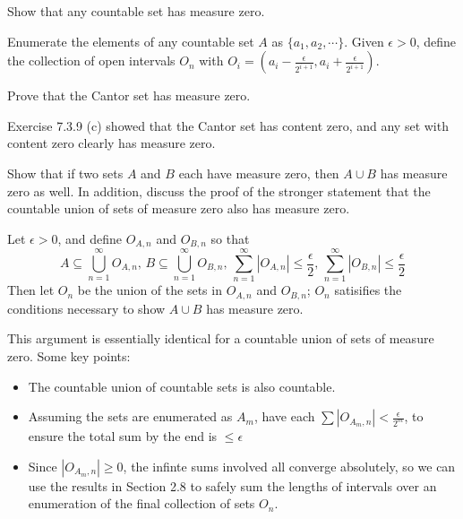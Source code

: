 \begin{exercise}
Show that any countable set has measure zero.
\end{exercise}
\begin{solution}
Enumerate the elements of any countable set \(A\) as \(\{a_1, a_2, \cdots\}\). Given \(\epsilon > 0\), define the collection of open intervals \(O_n\) with \(O_i = (a_i - \frac{\epsilon}{2^{i + 1}}, a_i + \frac{\epsilon}{2^{i+1}})\).
\end{solution}

\begin{exercise}
Prove that the Cantor set has measure zero.
\end{exercise}

\begin{solution}
Exercise 7.3.9 (c) showed that the Cantor set has content zero, and any set with content zero clearly has measure zero.
\end{solution}

\begin{exercise}
Show that if two sets \(A\) and \(B\) each have measure zero, then \(A \cup B\) has measure zero as well. In addition, discuss the proof of the stronger statement that the countable union of sets of measure zero also has measure zero.
\end{exercise}

\begin{solution}
Let \(\epsilon > 0\), and define \(O_{A,n}\) and \(O_{B,n}\) so that
\[A \subseteq \bigcup^\infty_{n=1} O_{A,n} \text{, }
B \subseteq \bigcup^\infty_{n=1} O_{B,n} \text{, }
\sum^\infty_{n=1}|O_{A,n}| \leq \frac{\epsilon}{2} \text{, }
\sum^\infty_{n=1}|O_{B,n}| \leq \frac{\epsilon}{2}
\]
Then let \(O_n\) be the union of the sets in \(O_{A,n}\) and \(O_{B,n}\); \(O_n\) satisifies the conditions necessary to show \(A \cup B\) has measure zero.

This argument is essentially identical for a countable union of sets of measure zero. Some key points:
\begin{itemize}
    \item The countable union of countable sets is also countable.
    \item Assuming the sets are enumerated as \(A_m\), have each \(\sum |O_{A_m, n}| < \frac{\epsilon}{2^m}\), to ensure the total sum by the end is \(\leq \epsilon\)
    \item Since \(|O_{A_m, n}| \geq 0\), the infinte sums involved all converge absolutely, so we can use the results in Section 2.8 to safely sum the lengths of intervals over an enumeration of the final collection of sets \(O_n\).
\end{itemize}
\end{solution}

